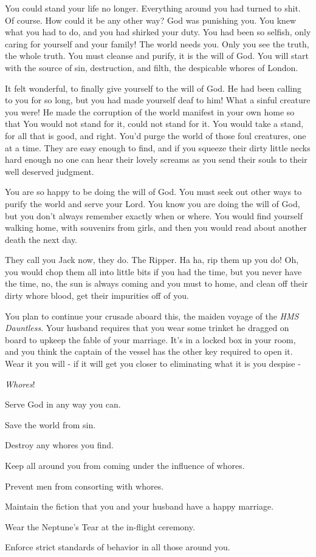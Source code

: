 \documentclass[char]{airship}
\begin{document}
You could stand your life no longer. Everything around you had turned
to shit. Of course. How could it be any other way? God was punishing
you. You knew what you had to do, and you had shirked your duty. You
had been so selfish, only caring for yourself and your family! The
world needs you. Only you see the truth, the whole truth. You must
cleanse and purify, it is the will of God. You will start with the
source of sin, destruction, and filth, the despicable whores of
London.

It felt wonderful, to finally give yourself to the will of God. He had
been calling to you for so long, but you had made yourself deaf to
him! What a sinful creature you were! He made the corruption of the
world manifest in your own home so that You would not stand for it,
could not stand for it. You would take a stand, for all that is good,
and right. You'd purge the world of those foul creatures, one at a
time. They are easy enough to find, and if you squeeze their dirty
little necks hard enough no one can hear their lovely screams as you
send their souls to their well deserved judgment.

You are so happy to be doing the will of God. You must seek out other
ways to purify the world and serve your Lord. You know you are doing
the will of God, but you don't always remember exactly when or
where. You would find yourself walking home, with souvenirs from
girls, and then you would read about another death the next day.

They call you Jack now, they do. The Ripper. Ha ha, rip them up you do!
Oh, you would chop them all into little bits if you had the time, but
you never have the time, no, the sun is always coming and you must to
home, and clean off their dirty whore blood, get their impurities off
of you.

You plan to continue your crusade aboard this, the maiden voyage of the {\em HMS
Dauntless}. Your husband requires that you wear some trinket he dragged on board
to upkeep the fable of your marriage. It's in a locked box in your room, and you
think the captain of the vessel has the other key required to open it. Wear it you will - 
if it will get you closer to eliminating what it is you despise -

{\em Whores}!

\begin{itemz}[Goals]
  \item Serve God in any way you can.
  \item Save the world from sin.
  \item Destroy any whores you find.
  \item Keep all around you from coming under the influence of whores.
  \item Prevent men from consorting with whores.
  \item Maintain the fiction that you and your husband have a happy marriage.
  \item Wear the Neptune's Tear at the in-flight ceremony.
  \item Enforce strict standards of behavior in all those around you.
\end{itemz}
\end{document}
